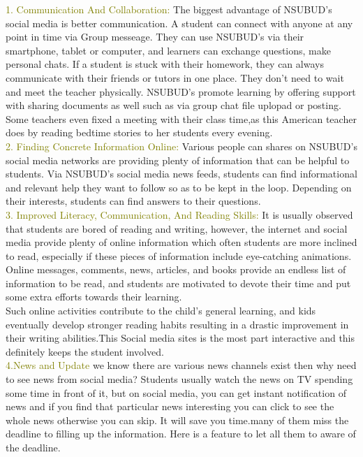 {{{{{\textcolor{olive}{1. Communication And Collaboration:}
The biggest advantage of NSUBUD's social media is better communication. A student can connect with anyone at any point in time via Group messeage.
 They can use NSUBUD's via their smartphone, tablet or computer, and learners can exchange questions, make personal chats. 
If a student is stuck with their homework, they can always communicate with their friends or tutors in one place. They don’t need to wait and meet the 
teacher physically. NSUBUD's promote learning by offering support with sharing documents as well such as via group chat file uplopad or posting.
 Some teachers even fixed a meeting with their class time,as this American teacher does by reading bedtime stories to her students every evening.\\
{\textcolor{olive}{2. Finding Concrete Information Online:}
Various people can shares on NSUBUD's social media networks are providing plenty of information that can be helpful to students. Via
NSUBUD's social media news feeds, students can find informational and relevant help they want to follow so as to be kept in the loop. Depending on their interests, students can find answers to their questions. \\
{\textcolor{olive}{3. Improved Literacy, Communication, And Reading Skills:}
It is usually observed that students are bored of reading and writing, however, the internet and social media provide plenty of online information which often students are more inclined to read, especially if these pieces of information include eye-catching animations. Online messages, comments, news, articles, and books provide an endless list of information to be read, and students are motivated to devote their time and put some extra efforts towards their learning.\\
Such online activities contribute to the child's general learning, and kids eventually develop stronger reading habits resulting in a drastic improvement in their writing abilities.This Social media sites is  the most part interactive and this definitely keeps the student involved.\\
{\textcolor{olive}{4.News and Update}
we know there are various news channels exist then why need to see news from social media? Students usually watch the news on TV spending some time in front of it, but on social media, you can get instant notification of news and if you find that particular news interesting you can click to see the whole news otherwise you can skip. It will save you time.many of them miss the deadline to filling up the information. Here is a feature to let all them to aware of the deadline.\\
}}}}}}}}
